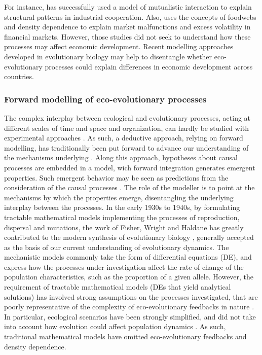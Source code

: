 % 
For instance, \cite{Saavedra2009a} has successfully used a model of mutualistic interaction to explain structural patterns in industrial cooperation.
% 
Also, \cite{Scholl2020} uses the concepts of foodwebs and density dependence to explain market malfunctions and excess volatility in financial markets.
% 
However, those studies did not seek to understand how these processes may affect economic development.
% 
Recent modelling approaches developed in evolutionary biology may help to disentangle whether eco-evolutionary processes could explain differences in economic development across countries.

\subsubsection*{Forward modelling of eco-evolutionary processes}
The complex interplay between ecological and evolutionary processes, acting at different scales of time and space and organization, can hardly be studied with experimental approaches \cite{Pontarp2019,Hagen2022}. 
As such, a deductive approach, relying on forward modelling, has traditionally been put forward to advance our understanding of the mechanisms underlying \cite{Brummitt2020}. Along this approach, hypotheses about causal processes are embedded in a model, wich forward integration generates emergent properties. Such emergent behavior may be seen as predictions from the consideration of the causal processes \cite{May2004}. The role of the modeller is to point at the mechanisms by which the properties emerge, disentangling the underlying interplay between the processes. %
% 
In the early 1930s to 1940s, by formulating tractable mathematical models implementing the processes of reproduction, dispersal and mutations, the work of Fisher, Wright and Haldane has greatly contributed to the modern synthesis of evolutionary biology \cite{huxley1942evolution}, generally accepted as the basis of our current understanding of evolutionary dynamics. 
% 
The mechanistic models commonly take the form of differential equations (DE), and express how the processes under investigation affect the rate of change of the population characteristics, such as the proportion of a given allele. 
% 
However, the requirement of tractable mathematical models (DEs that yield analytical solutions) has involved strong assumptions on the processes investigated, that are poorly representative of the complexity of eco-evolutionary feedbacks in nature \cite{Govaert2019a}. In particular, ecological scenarios have been strongly simplified, and did not take into account how evolution could affect population dynamics \cite{Lion2022}. As such, traditional mathematical models have omitted eco-evolutionary feedbacks and density dependence.

